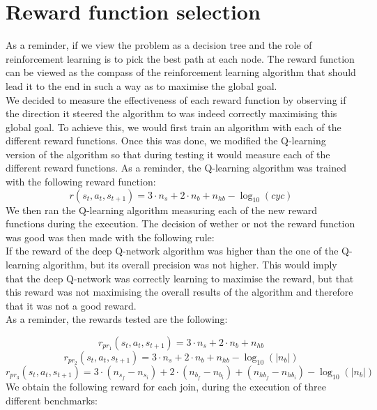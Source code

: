 \section{Reward function selection}
As a reminder, if we view the problem as a decision tree and the role of reinforcement learning is to pick the best path at each node. The reward function can be viewed as the compass of the reinforcement learning algorithm that should lead it to the end in such a way as to maximise the global goal.\\
We decided to measure the effectiveness of each reward function by observing if the direction it steered the algorithm to was indeed correctly maximising this global goal. To achieve this, we would first train an algorithm with each of the different reward functions. Once this was done, we modified the Q-learning version of the algorithm so that during testing it would measure each of the different reward functions. As a reminder, the Q-learning algorithm was trained with the following reward function:
\begin{equation}
	r(s_t,a_t,s_{t+1}) = 3  \cdot n_s + 2 \cdot n_b + n_{hb} - \log_{10}(cyc)
\end{equation}
We then ran the Q-learning algorithm measuring each of the new reward  functions during the execution. The decision of wether or not the reward function was good was then made with the following rule:\\
If the reward of the deep Q-network algorithm was higher than the one of the Q-learning algorithm, but its overall precision was not higher. This would imply that the deep Q-network was correctly learning to maximise the reward, but that this reward was not maximising the overall results of the algorithm and therefore that it was not a good reward.\\
As a reminder, the rewards tested are the following:
 
\begin{equation}
		r_{pr_1}(s_t,a_t,s_{t+1}) = 3  \cdot n_s + 2 \cdot n_b + n_{hb}
\end{equation}
\begin{equation}
		r_{pr_2}(s_t,a_t,s_{t+1}) = 3  \cdot n_s + 2 \cdot n_b + n_{hb} - \log_{10}(|n_b|)
\end{equation}
\begin{equation}
		r_{pr_3}(s_t,a_t,s_{t+1}) = 3  \cdot (n_{s_f} - n_{s_i}) + 2 \cdot (n_{b_f} - n_{b_i}) + (n_{hb_f} - n_{hb_i}) - \log_{10}(|n_b|)
\end{equation}
We obtain the following reward for each join, during the execution of three different benchmarks: 

